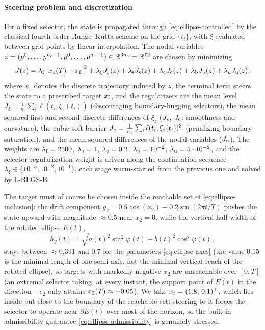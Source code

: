 \documentclass[11pt]{elsarticle}
\theoremstyle{definition}
\theoremstyle{remark}
\numberwithin{equation}{section}
\begin{document}
\paragraph{Steering problem and discretization}
For a fixed selector, the state is propagated through
\eqref{eq:ellipse-controlled} by the classical fourth-order
Runge--Kutta scheme on the grid $\{t_i\}$, with $\xi$ evaluated between
grid points by linear interpolation. The nodal variables
$z=(p^0,\dots,p^{n_{\rm c}-1},\rho^0,\dots,\rho^{n_{\rm c}-1})
\in\mathbb{R}^{3n_{\rm c}}=\mathbb{R}^{72}$
are chosen by minimizing
\begin{equation}
	\label{eq:ellipse-cost}
	J(z)=\lambda_{\rm f}\,\bigl|x_z(T)-x_{\rm f}\bigr|^2
	+\lambda_{\xi}J_{\xi}(z)+\lambda_{\rm s}J_{\rm s}(z)
	+\lambda_{\rm c}J_{\rm c}(z)+\lambda_{\rm b}J_{\rm b}(z)
	+\lambda_{\rm u}J_{\rm u}(z),
\end{equation}
where $x_z$ denotes the discrete trajectory induced by $z$, the terminal
term steers the state to a prescribed target $x_{\rm f}$, and the
regularizers are the mean level
$J_{\xi}=\frac{1}{n_t}\sum_i\ell(t_i,\xi_z(t_i))$
(discouraging boundary-hugging selectors), the mean squared first and
second discrete differences of $\xi_z$
($J_{\rm s}$, $J_{\rm c}$: smoothness and curvature), the cubic soft
barrier $J_{\rm b}=\frac{1}{n_t}\sum_i\ell(t_i,\xi_z(t_i))^3$
(penalizing boundary saturation), and the mean squared differences of
the nodal variables ($J_{\rm u}$). The weights are
$\lambda_{\rm f}=2500$, $\lambda_{\rm s}=1$, $\lambda_{\rm c}=0.2$,
$\lambda_{\rm b}=10^{-2}$, $\lambda_{\rm u}=5\cdot10^{-2}$, and the
selector-regularization weight is driven along the continuation sequence
$\lambda_{\xi}\in\{10^{-3},10^{-2},10^{-1}\}$, each stage warm-started
from the previous one and solved by L-BFGS-B.

The target must of course be chosen inside the reachable set of
\eqref{eq:ellipse-inclusion}: the drift component
$g_2=0.5\cos(x_2)-0.2\sin(2\pi t/T)$ pushes the state upward with
magnitude $\approx0.5$ near $x_2=0$, while the vertical half-width of the
rotated ellipse $E(t)$,
\[
h_y(t)=\sqrt{a(t)^2\sin^2\varphi(t)+b(t)^2\cos^2\varphi(t)},
\]
stays between $\approx0.391$ and $0.7$ for the parameters
\eqref{eq:ellipse-axes} (the value $0.15$ is the minimal length of one
semi-axis, not the minimal vertical reach of the rotated ellipse), so
targets with markedly negative
$x_2$ are unreachable over $[0,T]$ (an extremal selector taking, at
every instant, the support point of $E(t)$ in the direction $-e_2$ only
attains $x_2(T)\approx-0.05$). We take
$x_{\rm f}=(1.8,\,0.1)^{\top}$, which lies inside but close to the
boundary of the reachable set: steering to it forces the selector to
operate near $\partial E(t)$ over most of the horizon, so the built-in
admissibility guarantee \eqref{eq:ellipse-admissibility} is genuinely
stressed.
\end{document}

